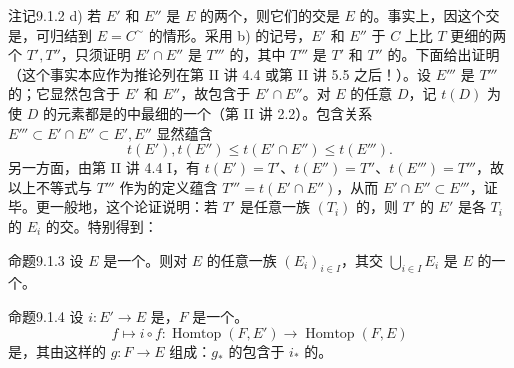 \begin{SGAresult}{注记}{9.1.2}
d) 若 $E'$ 和 $E''$ 是 $E$ 的两个，则它们的交是 $E$ 的。事实上，因这个交是，可归结到 $E=C^\sim$ 的情形。采用 b) 的记号，$E'$ 和 $E''$ 于 $C$ 上比 $T$ 更细的两个 $T',T''$，只须证明 $E'\cap E''$ 是 $T'''$ 的，其中 $T'''$ 是 $T'$ 和 $T''$ 的。下面给出证明（这个事实本应作为推论列在第 II 讲 4.4 或第 II 讲 5.5 之后！）。设 $E'''$ 是 $T'''$ 的；它显然包含于 $E'$ 和 $E''$，故包含于 $E'\cap E''$。对 $E$ 的任意 $D$，记 $t(D)$ 为使 $D$ 的元素都是的中最细的一个（第 II 讲 2.2）。包含关系 $E'''\subset E'\cap E''\subset E',E''$ 显然蕴含
\[
t(E'),t(E'')\le t(E'\cap E'')\le t(E''').
\]
另一方面，由第 II 讲 4.4 I，有 $t(E')=T'$、$t(E'')=T''$、$t(E''')=T'''$，故以上不等式与 $T'''$ 作为的定义蕴含 $T'''=t(E'\cap E'')$，从而 $E'\cap E''\subset E'''$，证毕。更一般地，这个论证说明：若 $T'$ 是任意一族 $(T_i)$ 的，则 $T'$ 的 $E'$ 是各 $T_i$ 的 $E_i$ 的交。特别得到：
\end{SGAresult}
\begin{SGAresult}{命题}{9.1.3}
设 $E$ 是一个。则对 $E$ 的任意一族 $(E_i)_{i\in I}$，其交 $\bigcup_{i\in I}E_i$ 是 $E$ 的一个。
\end{SGAresult}
\begin{SGAresult}{命题}{9.1.4}
设 $i:E'\to E$ 是，$F$ 是一个。
\[
f\longmapsto i\circ f:\operatorname{Homtop}(F,E')\longrightarrow\operatorname{Homtop}(F,E)\tag{9.1.4.1}
\]
是，其由这样的 $g:F\to E$ 组成：$g_*$ 的包含于 $i_*$ 的。
\end{SGAresult}
